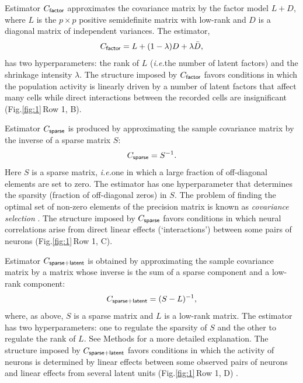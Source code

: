 \documentclass[10pt]{article}
\newcommand{\sq}[1]{\lq#1\rq}
\newcommand{\figref}[2]{Fig.\;\ref{fig:#1}\,#2}
\newcommand{\ie}{\emph{i.e.}\;}
\begin{document}
Estimator $C_{\sf factor}$ approximates the covariance matrix by the factor model $L + D$, where $L$ is the $p\times p$ positive semidefinite matrix with low-rank and $D$ is a diagonal matrix of independent variances. The estimator, 
\begin{equation}\label{eq:c-factor}
C_{\sf factor} = L + (1-\lambda)D + \lambda \bar D,
\end{equation}
has two hyperparameters: the rank of $L$ (\ie the number of latent factors) and the shrinkage intensity $\lambda$. The structure imposed by $C_{\sf factor}$ favors conditions in which the population activity is linearly driven by a number of latent factors that affect many cells while direct interactions between the recorded cells are insignificant (\figref{1}{Row 1, B}).   

Estimator $C_{\sf sparse}$ is produced by approximating the sample covariance matrix by the inverse of a sparse matrix $S$: 
\begin{equation}\label{eq:c-sparse}
C_{\sf sparse} = S^{-1}.
\end{equation}
Here $S$ is a sparse matrix, \ie one in which a large fraction of off-diagonal elements are set to zero.  The estimator has one hyperparameter that determines the sparsity (fraction of off-diagonal zeros) in $S$. The problem of finding the optimal set of non-zero elements of the precision matrix is known as \emph{covariance selection} \cite{Dempster:1972}. The structure imposed by $C_{\sf sparse}$ favors conditions in which neural correlations arise from direct linear effects (\sq{interactions}) between some pairs of neurons (\figref{1}{Row 1, C}).  


Estimator $C_{\sf sparse+latent}$ is obtained by approximating the sample covariance matrix by a matrix whose inverse is the sum of a sparse component and a low-rank component: 
\begin{equation}\label{eq:c-sl}
C_{\sf sparse+latent} = (S - L)^{-1},
\end{equation}
where, as above, $S$ is a sparse matrix and $L$ is a low-rank matrix. The estimator has two hyperparameters: one to regulate the sparsity of $S$ and the other to regulate the rank of $L$. See Methods for a more detailed explanation. The structure imposed by $C_{\sf sparse+latent}$ favors conditions in which the activity of neurons is determined by linear effects between some observed pairs of neurons and linear effects from several latent units (\figref{1}{Row 1, D}) \cite{Chandrasekaran:2010,Ma:2013}.
\end{document}
